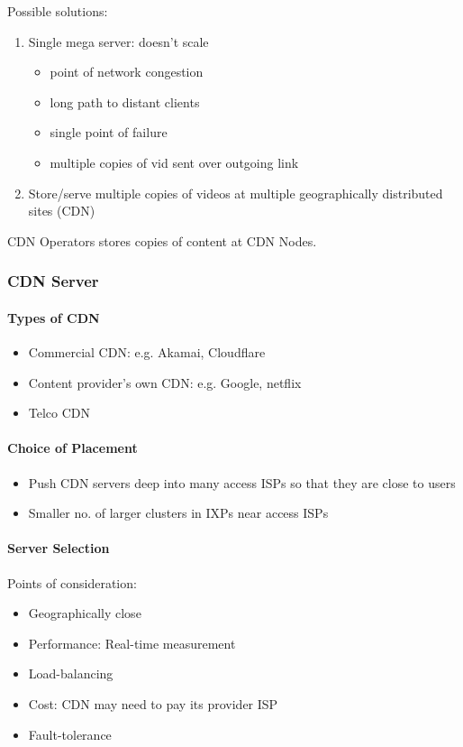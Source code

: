 \documentclass[a4paper]{article}
\begin{document}
\noindent Possible solutions:
\begin{enumerate}
    \item Single mega server: doesn't scale
    \begin{itemize}[label=$\circ$]
        \item point of network congestion
        \item long path to distant clients
        \item single point of failure
        \item multiple copies of vid sent over outgoing link
    \end{itemize}
    \item Store/serve multiple copies of videos at multiple geographically distributed sites (CDN)
\end{enumerate}
CDN Operators stores copies of content at CDN Nodes.

\subsubsection{CDN Server}
\paragraph{Types of CDN}
\begin{itemize}
    \item Commercial CDN: e.g. Akamai, Cloudflare
    \item Content provider's own CDN: e.g. Google, netflix
    \item Telco CDN
\end{itemize}

\paragraph{Choice of Placement}
\begin{itemize}
    \item Push CDN servers deep into many access ISPs so that they are close to users
    \item Smaller no. of larger clusters in IXPs near access ISPs
\end{itemize}

\paragraph{Server Selection}\mbox{}

\medskip
\noindent Points of consideration:
\begin{itemize}
    \item Geographically close
    \item Performance: Real-time measurement
    \item Load-balancing
    \item Cost: CDN may need to pay its provider ISP
    \item Fault-tolerance
\end{itemize}
\end{document}
